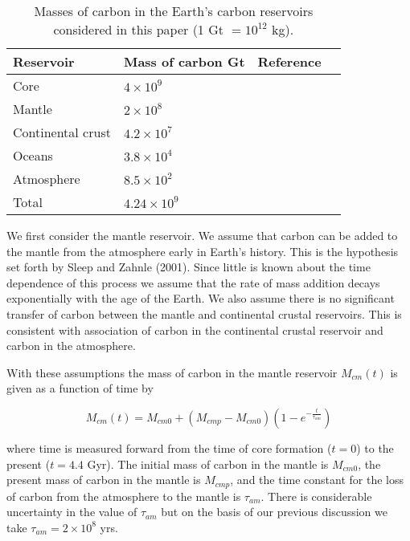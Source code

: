 {\renewcommand{\arraystretch}{2.0}%
\begin{table}[b!]
    \centering
    \begin{tabular}{|l|l|c|c|}
        \hline
        Reservoir & Mass of carbon Gt & Reference \\
        \hline
        Core   & $4 \times 10^9$ & ~\citet{DR:2013}  \\
        \hline
        Mantle & $2 \times 10^8$ & ~\citet{KLH-TDL-WM:2017}  \\
        \hline
        Continental crust & $4.2 \times 10^7$ & ~\citet{KHW:1995} \\
        \hline
        Oceans & $3.8 \times 10^4$ & ~\citet{HRA:2007} \\
        \hline
        Atmosphere & $8.5 \times 10^2$ & ~\citet{NOAA:2017} \\
        \hline
        Total & $4.24 \times 10^9$ & \\
        \hline
    \end{tabular}
    \caption{\doublespacing Masses of carbon in the Earth's carbon reservoirs considered in this paper (1 Gt $= 10^{12}$ kg).
    }
    \label{Table:Masses of carbon in Earth's reservoirs}
\end{table}

We first consider the mantle reservoir. We assume that carbon can be added to the mantle from the atmosphere early in Earth's history. This is the hypothesis set forth by Sleep and Zahnle (2001). Since little is known about the time dependence of this process we assume that the rate of mass addition decays exponentially with the age of the Earth. We also assume there is no significant transfer of carbon between the mantle and continental crustal reservoirs. This is consistent with association of carbon in the continental crustal reservoir and carbon in the atmosphere.

With these assumptions the mass of carbon in the mantle reservoir $M_{cm}(t)$ is given as a function of time by

\begin{equation}
  M_{cm}(t) = M_{cm0} + (M_{cmp} - M_{cm0}) (1 - e^{-\frac{t}{\tau_{am}}})
\end{equation}

where time is measured forward from the time of core formation ($t=0$) to the present ($t=4.4$ Gyr). The initial mass of carbon in the mantle is $M_{cm0}$, the present mass of carbon in the mantle is $M_{cmp}$, and the time constant for the loss of carbon from the atmosphere to the mantle is $\tau_{am}$. There is considerable uncertainty in the value of $\tau_{am}$ but on the basis of our previous discussion we take $\tau_{am} = 2 \times 10^8$ yrs.

}
